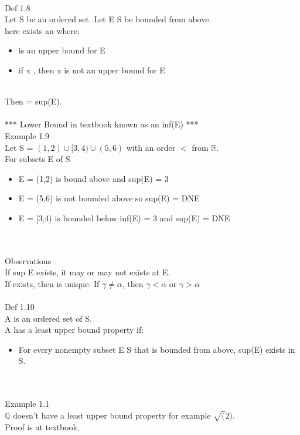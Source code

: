 \hfill \\
Def 1.8 \\
Let S be an ordered set. Let E \subset S be bounded from above. \\
here exists an \alpha where:
\begin{itemize}
	\item \alpha is an upper bound for E
	\item if x \< \alpha, then x is not an upper bound for E
\end{itemize} \\
Then \alpha = sup(E). \\

\hfill \\
*** Lower Bound in textbook known as an inf(E) *** \\
Example 1.9 \\
Let S = $ (1,2) \cup [3,4) \cup (5,6) $ with an order $ < $ from $ \mathbb{R} $. \\
For subsets E of S \\
\begin{itemize}
	\item E = (1,2) is bound above and sup(E) = 3
	\item E = (5,6) is not bounded above so sup(E) = DNE
	\item E = [3,4) is bounded below inf(E) = 3 and sup(E) = DNE
\end{itemize} \\

\hfill \\
Observations \\
If sup E exists, it may or may not exists at E. \\
If \alpha exists, then \alpha is unique.
If $ \gamma \neq \alpha $, then $ \gamma < \alpha $ or $ \gamma > \alpha $ \\

\hfill \\
Def 1.10 \\
A is an ordered set of S. \\
A has a least upper bound property if:
\begin{itemize}
	\item For every nonempty subset E \subset S that is bounded from above, sup(E) exists in S.
\end{itemize} \\

\hill \\
Example 1.1 \\
$ \mathbb{Q} $ doesn't have a least upper bound property for example $ \sqrt(2) $. \\
Proof is at textbook.


